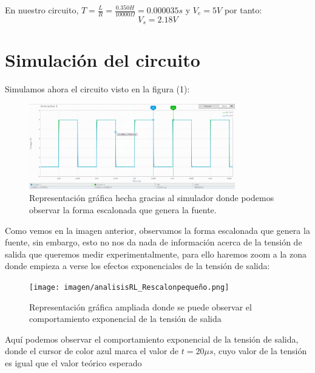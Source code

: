 \documentclass[11pt,letterpaper]{article}
\begin{document}
En nuestro circuito, $T=\frac{L}{R}=\frac{0.350 H}{10000 \Omega}= 0.000035 s$ y $V_e= 5 V$ por tanto:
\begin{equation}
	\boxed{V_s=2.18V}
\end{equation}
\section{Simulación del circuito}%
\label{sec:Simulación del circuito}
Simulamos ahora el circuito visto en la figura (1):
\begin{figure}[H]
	\centering
	\includegraphics[width=0.8\textwidth]{imagen/analisisRL_R_escalongrande.png}
	\caption{Representación gráfica hecha gracias al simulador donde podemos observar la forma escalonada que genera la fuente.}
	\label{fig:imagen-analisisRL_R_escalongrande-png}
\end{figure}
Como vemos en la imagen anterior, observamos la forma escalonada que genera la fuente, sin embargo, esto no nos da nada de información acerca de la tensión de salida que queremos medir experimentalmente, para ello haremos zoom a la zona donde empieza a verse los efectos exponenciales de la tensión de salida:
\begin{figure}[H]
	\centering
	\texttt{[image: imagen/analisisRL\_Rescalonpequeño.png]}
	\caption{Representación gráfica ampliada donde se puede observar el comportamiento exponencial de la tensión de salida}
	\label{fig:imagen-analisisRL_Rescalonpeque-png}
\end{figure}
Aquí podemos observar el comportamiento exponencial de la tensión de salida, donde el cursor de color azul marca el valor de $t=20\mu s$, cuyo valor de la tensión es igual que el valor teórico esperado
\end{document}
